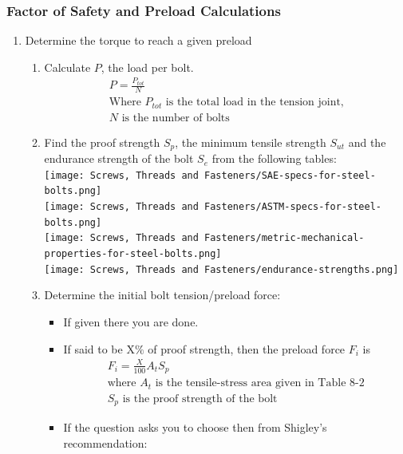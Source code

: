 \documentclass[11pt, fleqn]{article}
\begin{document}
\subsubsection{Factor of Safety and Preload Calculations}
    \begin{enumerate}    
        \item Determine the torque to reach a given preload
        \begin{enumerate}
            \item Calculate $P$, the load per bolt.
            \begin{align*}
                P = \frac{P_{tot}}{N}\\
                \text{Where $P_{tot}$ is the total load in the tension joint,}\\
                \text{$N$ is the number of bolts}
            \end{align*}
            \item Find the proof strength $S_p$, the minimum tensile strength $S_{ut}$ and the endurance strength of the bolt $S_e$ from the following tables:\\
            \texttt{[image: Screws, Threads and Fasteners/SAE-specs-for-steel-bolts.png]}\\
            \texttt{[image: Screws, Threads and Fasteners/ASTM-specs-for-steel-bolts.png]}\\
            \texttt{[image: Screws, Threads and Fasteners/metric-mechanical-properties-for-steel-bolts.png]}\\
            \texttt{[image: Screws, Threads and Fasteners/endurance-strengths.png]}
            \item Determine the initial bolt tension/preload force:
             \begin{itemize}
                    \item If given there you are done.
                    \item If said to be X$\%$ of proof strength, then the preload force $F_i$ is
                        \begin{align*}
                        F_i = \frac{X}{100}A_tS_p\\
                        \text{where $A_t$ is the tensile-stress area given in Table 8-2}\\
                        \text{$S_p$ is the proof strength of the bolt }
                        \end{align*}
                    \item If the question asks you to choose then from Shigley's recommendation:

\end{itemize}
\end{enumerate}
\end{enumerate}
\end{document}
